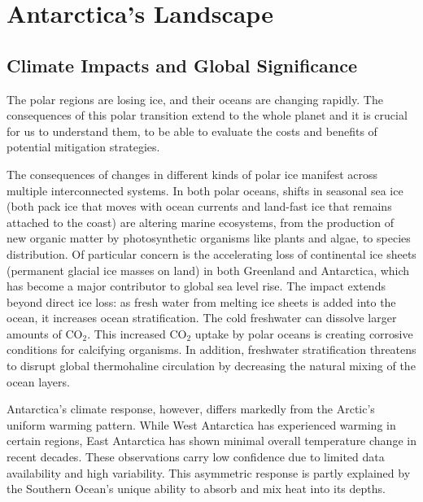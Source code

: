 \chapter*{Antarctica's Landscape}\label{why}
\section*{Climate Impacts and Global Significance}

The polar regions are losing ice, and their oceans are changing rapidly\cite{O_C_in_changingClimate}. The consequences of this polar transition extend to the whole planet and it is crucial for us to understand them, to be able to evaluate the costs and benefits of potential mitigation strategies. 

The consequences of changes in different kinds of polar ice manifest across multiple interconnected systems. In both polar oceans, shifts in seasonal sea ice (both pack ice that moves with ocean currents and land-fast ice that remains attached to the coast\cite{SeaIce}) are altering marine ecosystems, from the production of new organic matter by photosynthetic organisms like plants and algae, to species distribution\cite{O_C_in_changingClimate}. Of particular concern is the accelerating loss of continental ice sheets (permanent glacial ice masses on land) in both Greenland and Antarctica, which has become a major contributor to global sea level rise\cite{O_C_in_changingClimate}. The impact extends beyond direct ice loss: as fresh water from melting ice sheets is added into the ocean, it increases ocean stratification. The cold freshwater can dissolve larger amounts of $\mathrm{CO_2}$. This increased $\mathrm{CO_2}$ uptake by polar oceans is creating corrosive conditions for calcifying organisms\cite{O_C_in_changingClimate}. In addition, freshwater stratification threatens to disrupt global thermohaline circulation\cite{Jacobs_2004} by decreasing the natural mixing of the ocean layers.

Antarctica's climate response, however, differs markedly from the Arctic's uniform warming pattern. While West Antarctica has experienced warming in certain regions, East Antarctica has shown minimal overall temperature change in recent decades\cite{O_C_in_changingClimate}. These observations carry low confidence due to limited data availability and high variability\cite{O_C_in_changingClimate}. This asymmetric response is partly explained by the Southern Ocean's unique ability to absorb and mix heat into its depths\cite{L_T_C_C}.
 
